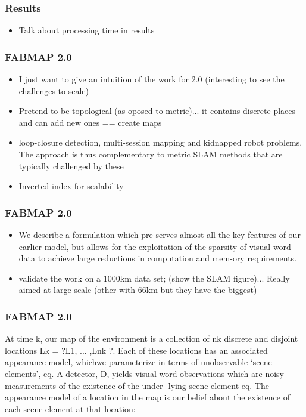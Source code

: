 \begin{frame}
    \frametitle{Results}
    \begin{itemize}
        \item Talk about processing time in results
    \end{itemize}
\end{frame}

\begin{frame}
    \frametitle{FABMAP 2.0}
    \begin{itemize}
        \item I just want to give an intuition of the work for 2.0 (interesting to see the challenges to scale)
        \item Pretend to be topological (as oposed to metric)... it contains discrete places and can add new ones == create maps
        \item loop-closure detection, multi-session mapping and kidnapped robot problems. The approach is thus complementary to metric SLAM methods that are typically challenged by these
        \item Inverted index for scalability
    \end{itemize}
\end{frame}

\begin{frame}
    \frametitle{FABMAP 2.0}
    \begin{itemize}
        \item We describe a formulation which pre-serves almost all the key features of our earlier model, but allows for the exploitation of the sparsity of visual word data to achieve large reductions in computation and mem-ory requirements.
        \item validate the work on a 1000km data set; (show the SLAM figure)... Really aimed at large scale (other with 66km but they have the biggest)
    \end{itemize}
\end{frame}

\begin{frame}
    \frametitle{FABMAP 2.0}
    At time k, our map of the environment is a collection of nk discrete and disjoint locations Lk = ?L1, ... ,Lnk ?. Each of these locations has an associated appearance model, whichwe parameterize in terms of unobservable ‘scene elements’, eq. A detector, D, yields visual word observations which are noisy measurements of the existence of the under- lying scene element eq. The appearance model of a location in the map is our belief about the existence of each scene element at that location:
\end{frame}

